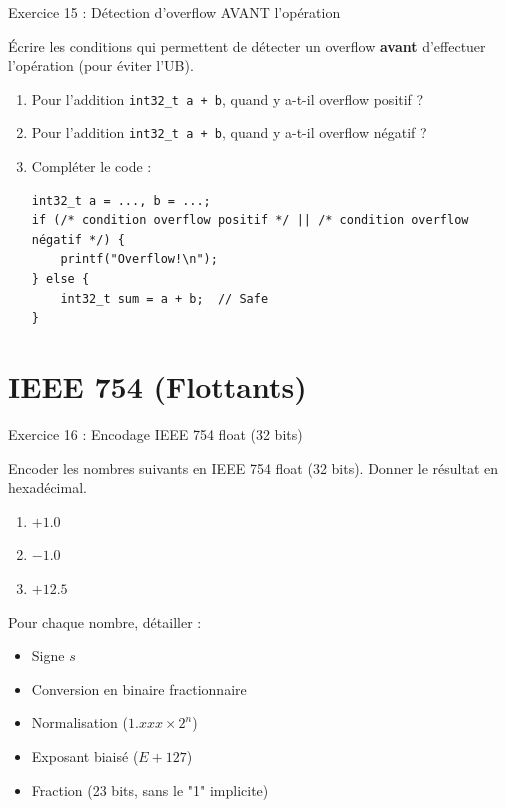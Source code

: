 \documentclass[10pt,a4paper]{article}
\begin{document}
\begin{exercicebox}{Exercice 15 : Détection d'overflow AVANT l'opération}

Écrire les conditions qui permettent de détecter un overflow \textbf{avant} d'effectuer l'opération (pour éviter l'UB).

\begin{enumerate}[label=\alph*)]
    \item Pour l'addition \texttt{int32\_t a + b}, quand y a-t-il overflow positif ?
    \item Pour l'addition \texttt{int32\_t a + b}, quand y a-t-il overflow négatif ?
    \item Compléter le code :
\begin{lstlisting}[numbers=none]
int32_t a = ..., b = ...;
if (/* condition overflow positif */ || /* condition overflow négatif */) {
    printf("Overflow!\n");
} else {
    int32_t sum = a + b;  // Safe
}
\end{lstlisting}
\end{enumerate}
\end{exercicebox}

\section{IEEE 754 (Flottants)}

\begin{exercicebox}{Exercice 16 : Encodage IEEE 754 float (32 bits)}

Encoder les nombres suivants en IEEE 754 float (32 bits). Donner le résultat en hexadécimal.

\begin{enumerate}[label=\alph*)]
    \item $+1.0$
    \item $-1.0$
    \item $+12.5$
\end{enumerate}

Pour chaque nombre, détailler :
\begin{itemize}
    \item Signe $s$
    \item Conversion en binaire fractionnaire
    \item Normalisation ($1.xxx \times 2^n$)
    \item Exposant biaisé ($E + 127$)
    \item Fraction (23 bits, sans le "1" implicite)
\end{itemize}
\end{exercicebox}
\end{document}
